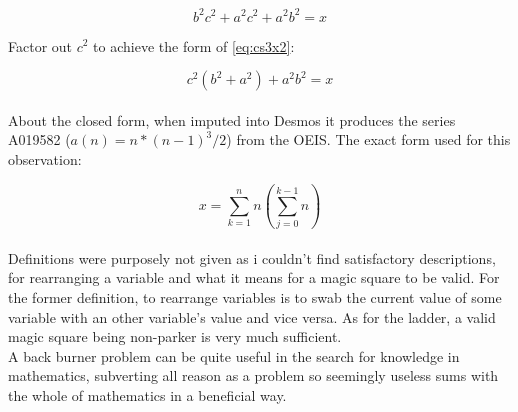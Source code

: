 \documentclass[a4paper]{article}
\begin{document}
\begin{equation}
b^2c^2 + a^2c^2 + a^2b^2 = x \label{eq:ee3x3}
\end{equation}

Factor out $c^2$ to achieve the form of \eqref{eq:cs3x2}:

\begin{equation}
c^2(b^2 + a^2) + a^2b^2 = x \label{eq:e3x3}
\end{equation} \\

About the closed form, when imputed into Desmos it produces the series A019582 ($a(n) = n*(n - 1)^3/2$) from the OEIS. The exact form used for this observation:

\begin{equation}
x=\sum_{k=1}^{n}n\left(\sum_{j=0}^{k-1}n\right)
\end{equation} \\

Definitions were purposely not given as i couldn't find satisfactory descriptions, for rearranging a variable and what it means for a magic square to be valid. For the former definition, to rearrange variables is to swab the current value of some variable with an other variable's value and vice versa. As for the ladder, a valid magic square being non-parker is very much sufficient. \\

A back burner problem can be quite useful in the search for knowledge in mathematics, subverting all reason as a problem so seemingly useless sums with the whole of mathematics in a beneficial way.
\end{document}
